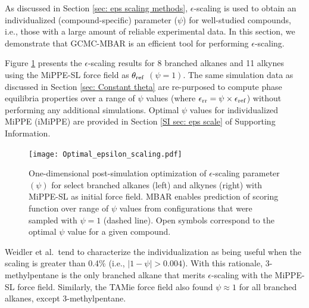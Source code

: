 \documentclass[journal=jced,manuscript=article]{achemso}
\begin{document}

As discussed in Section \ref{sec: eps scaling methods}, $\epsilon$-scaling is used to obtain an individualized (compound-specific) parameter ($\psi$) for well-studied compounds, i.e., those with a large amount of reliable experimental data. \cite{Weidler2018} In this section, we demonstrate that GCMC-MBAR is an efficient tool for performing $\epsilon$-scaling. 


Figure \ref{fig:epsilon_scaling} presents the $\epsilon$-scaling results for 8 branched alkanes and 11 alkynes using the MiPPE-SL force field as $\theta_{\rm ref}$ $(\psi = 1)$. The same simulation data as discussed in Section \ref{sec: Constant theta} are re-purposed to compute phase equilibria properties over a range of $\psi$ values (where $\epsilon_{\rm rr} = \psi \times \epsilon_{\rm ref}$) without performing any additional simulations. Optimal $\psi$ values for individualized MiPPE (iMiPPE) are provided in Section \ref{SI sec: eps scale} of Supporting Information. 

	\begin{figure}[htb!]
		\centering
		\texttt{[image: Optimal\_epsilon\_scaling.pdf]}
		\caption{One-dimensional post-simulation optimization of $\epsilon$-scaling parameter $(\psi)$ for select branched alkanes (left) and alkynes (right) with MiPPE-SL as initial force field. MBAR enables prediction of scoring function over range of $\psi$ values from configurations that were sampled with $\psi = 1$ (dashed line). Open symbols correspond to the optimal $\psi$ value for a given compound.}
		\label{fig:epsilon_scaling}
	\end{figure}

Weidler et al.~tend to characterize the individualization as being useful when the scaling is greater than 0.4\% (i.e., $|1 - \psi| > 0.004$).\cite{Weidler2018} With this rationale, 3-methylpentane is the only branched alkane that merits $\epsilon$-scaling with the MiPPE-SL force field. Similarly, the TAMie force field also found $\psi \approx 1$ for all branched alkanes, except 3-methylpentane. 
\end{document}
